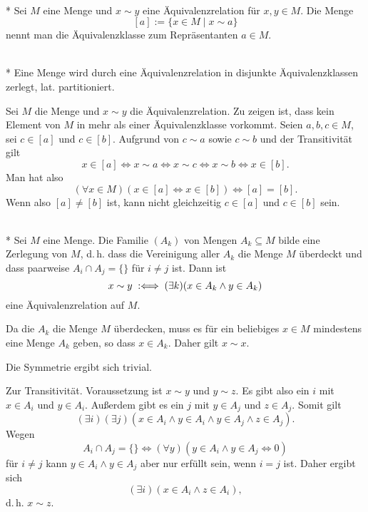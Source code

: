 \begin{Definition}[Äquivalenzklasse]\mbox{}\\*
Sei $M$ eine Menge und $x\sim y$ eine Äquivalenzrelation für $x,y\in M$.
Die Menge%
\[[a] := \{x\in M\mid x\sim a\}\]
nennt man die Äquivalenzklasse zum Repräsentanten $a\in M$.
\end{Definition}

\begin{Satz}\mbox{}\\*
Eine Menge wird durch eine Äquivalenzrelation in disjunkte
Äquivalenzklassen zerlegt, lat. partitioniert.
\end{Satz}
 Sei $M$ die Menge und $x\sim y$ die Äquivalenzrelation.
Zu zeigen ist, dass kein Element von $M$ in mehr als einer
Äquivalenzklasse vorkommt. Seien $a,b,c\in M$, sei $c\in [a]$
und $c\in [b]$. Aufgrund von $c\sim a$ sowie $c\sim b$ und der
Transitivität gilt%
\[x\in [a]\iff x\sim a\iff x\sim c\iff x\sim b\iff x\in [b].\]
Man hat also
\[(\forall x\in M)(x\in [a]\Leftrightarrow x\in [b])\iff [a]=[b].\]
Wenn also $[a]\ne [b]$ ist, kann nicht gleichzeitig $c\in [a]$ und $c\in [b]$
sein.\;\qedsymbol

\begin{Satz}\mbox{}\\*
Sei $M$ eine Menge. Die Familie $(A_k)$ von Mengen $A_k\subseteq M$
bilde eine Zerlegung von $M$, d.\,h. dass die Vereinigung aller
$A_k$ die Menge $M$ überdeckt und dass paarweise $A_i\cap A_j=\{\}$
für $i\ne j$ ist. Dann ist%
\[x\sim y\;:\Longleftrightarrow\; (\exists k)(x\in A_k\land y\in A_k)\]
eine Äquivalenzrelation auf $M$.
\end{Satz}
 Da die $A_k$ die Menge $M$ überdecken,
muss es für ein beliebiges $x\in M$ mindestens eine Menge $A_k$
geben, so dass $x\in A_k$. Daher gilt $x\sim x$.

Die Symmetrie ergibt sich trivial.

Zur Transitivität. Voraussetzung ist $x\sim y$ und $y\sim z$.
Es gibt also ein $i$ mit $x\in A_i$ und $y\in A_i$. Außerdem gibt
es ein $j$ mit $y\in A_j$ und $z\in A_j$. Somit gilt%
\[(\exists i)(\exists j)(x\in A_i\land y\in A_i\land y\in A_j\land z\in A_j).\]
Wegen
\[A_i\cap A_j = \{\} \iff (\forall y)(y\in A_i\land y\in A_j\iff 0)\]
für $i\ne j$ kann $y\in A_i\land y\in A_j$ aber nur erfüllt sein,
wenn $i=j$ ist. Daher ergibt sich%
\[(\exists i)(x\in A_i\land z\in A_i),\]
d.\,h. $x\sim z$.\;\qedsymbol

